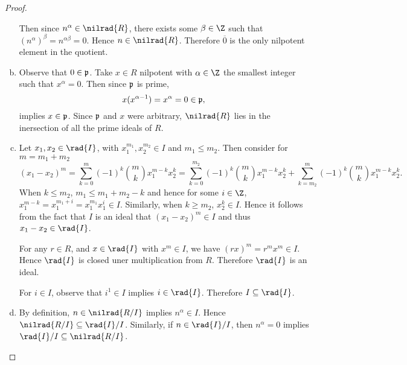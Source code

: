 \documentclass[10pt]{amsart}
\begin{document}
\begin{thm}
\begin{proof}
\begin{enumerate}[(a)]
      Then since $n^\alpha \in \nilrad{R}$, there exists some $\beta \in \Z$ such that $(n^\alpha)^\beta = n^{\alpha\beta} = 0$.
      Hence $n \in \nilrad{R}$.
      Therefore $\overline{0}$ is the only nilpotent element in the quotient.
    \item
      Observe that $0 \in \mathfrak{p}$.
      Take $x \in R$ nilpotent with $\alpha \in \Z$ the smallest integer such that $x^\alpha = 0$.
      Then since $\mathfrak{p}$ is prime,
      $$x(x^{\alpha - 1}) = x^\alpha = 0 \in \mathfrak{p},$$
      implies $x \in \mathfrak{p}$.
      Since $\mathfrak{p}$ and $x$ were arbitrary, $\nilrad{R}$ lies in the inersection of all the prime ideals of $R$.
    \item
      Let $x_1, x_2 \in \rad{I}$, with $x_1^{m_1}, x_2^{m_2} \in I$ and $m_1 \leq m_2$.
      Then consider for $m = m_1 + m_2$
      $$(x_1 - x_2)^m = \sum_{k=0}^m(-1)^k{m \choose k} x_1^{m-k}x_2^k = \sum_{k=0}^{m_2}(-1)^k{m \choose k} x_1^{m-k}x_2^k + \sum_{k=m_2}^m(-1)^k{m \choose k} x_1^{m-k}x_2^k.$$
      When $k \leq m_2$, $m_1 \leq m_1 + m_2 - k$ and hence for some $i \in \Z$, $x_1^{m-k} = x_1^{m_1 + i} = x_1^{m_1}x_1^i \in I$.
      Similarly, when $k \geq m_2$, $x_2^k \in I$.
      Hence it follows from the fact that $I$ is an ideal that $(x_1 - x_2)^m \in I$ and thus $x_1 - x_2 \in \rad{I}$.
      
      For any $r \in R$, and $x \in \rad{I}$ with $x^m \in I$, we have $(rx)^m = r^mx^m \in I$.
      Hence $\rad{I}$ is closed uner multiplication from $R$.
      Therefore $\rad{I}$ is an ideal.
      
      For $i \in I$, observe that $i^{1} \in I$ implies $i \in \rad{I}$.
      Therefore $I \subseteq \rad{I}$.
    \item
      By definition, $n \in \nilrad{R/I}$ implies $n^\alpha \in I$.
      Hence $\nilrad{R/I} \subseteq \rad{I}/I$.
      Similarly, if $n \in \rad{I}/I$, then $n^\alpha = 0$ implies $\rad{I}/I \subseteq \nilrad{R/I}$.
    \end{enumerate}
  \end{proof}
\end{thm}
\end{document}
